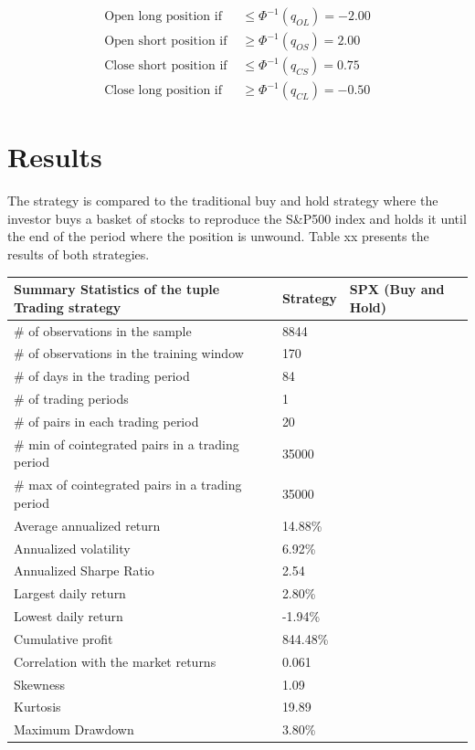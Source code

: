 \documentclass[11pt,a4,twosided,singlespacing,titlepagenumber=on]{scrreprt}
\numberwithin{equation}{chapter} %
\theoremstyle{remark}
\begin{document}
\begin{align*}
\text{Open long position if } &\leq \Phi^{-1}(q_{OL}) = -2.00\\
\text{Open short position if } &\geq \Phi^{-1}(q_{OS}) = 2.00\\
\text{Close short position if } &\leq \Phi^{-1}(q_{CS}) = 0.75\\
\text{Close long position if } &\geq \Phi^{-1}(q_{CL}) = -0.50
\end{align*}

\section{Results}

The strategy is compared to the traditional buy and hold strategy where the investor buys a basket of stocks to reproduce the S\&P500 index and holds it until the end of the period where the position is unwound. Table xx presents the results of both strategies.

\begin{table}[htb]
\centering
\begin{tabular}{lll}
\hline
Summary Statistics of the tuple Trading strategy				& Strategy & SPX (Buy and Hold)\\ \hline
\# of observations in the sample								& 8844  \\
\# of observations in the training window						& 170 \\
\# of days in the trading period								& 84 \\
\# of trading periods											& 1\\
\# of pairs in each trading period   							& 20\\
\# min of cointegrated pairs in a trading period 				& 35000\\
\# max of cointegrated pairs in a trading period 				& 35000\\
Average annualized return 										& 14.88\% \\
Annualized volatility 											& 6.92\% \\
Annualized Sharpe Ratio 										& 2.54  \\
Largest daily return 											& 2.80\% \\
Lowest daily return 											& -1.94\% \\
Cumulative profit 												& 844.48\%\\
Correlation with the market returns 							& 0.061\\
Skewness														& 1.09\\
Kurtosis 														& 19.89\\
Maximum Drawdown  												& 3.80\% \\
\hline
\end{tabular}
\end{table}
\end{document}
